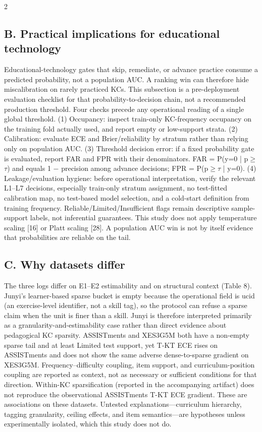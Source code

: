 \documentclass[10pt,a4paper]{article}
\begin{document}
\begin{multicols}{2}
\subsection*{B. Practical implications for educational technology}

Educational-technology gates that skip, remediate, or advance practice consume a predicted probability, not a population AUC. A ranking win can therefore hide miscalibration on rarely practiced KCs. This subsection is a pre-deployment evaluation checklist for that probability-to-decision chain, not a recommended production threshold. Four checks precede any operational reading of a single global threshold. (1) Occupancy: inspect train-only KC-frequency occupancy on the training fold actually used, and report empty or low-support strata. (2) Calibration: evaluate ECE and Brier/reliability by stratum rather than relying only on population AUC. (3) Threshold decision error: if a fixed probability gate is evaluated, report FAR and FPR with their denominators. FAR = P(y=0 | p$\geq$$\tau$) and equals 1 $-$ precision among advance decisions; FPR = P(p$\geq$$\tau$ | y=0). (4) Leakage/evaluation hygiene: before operational interpretation, verify the relevant L1--L7 decisions, especially train-only stratum assignment, no test-fitted calibration map, no test-based model selection, and a cold-start definition from training frequency. Reliable/Limited/Insufficient flags remain descriptive sample-support labels, not inferential guarantees. This study does not apply temperature scaling [16] or Platt scaling [28]. A population AUC win is not by itself evidence that probabilities are reliable on the tail.

\subsection*{C. Why datasets differ}

 The three logs differ on E1--E2 estimability and on structural context (Table 8). Junyi's learner-based sparse bucket is empty because the operational field is ucid (an exercise-level identifier, not a skill tag), so the protocol can refuse a sparse claim when the unit is finer than a skill. Junyi is therefore interpreted primarily as a granularity-and-estimability case rather than direct evidence about pedagogical KC sparsity. ASSISTments and XES3G5M both have a non-empty sparse tail and at least Limited test support, yet T-KT ECE rises on ASSISTments and does not show the same adverse dense-to-sparse gradient on XES3G5M. Frequency--difficulty coupling, item support, and curriculum-position coupling are reported as context, not as necessary or sufficient conditions for that direction. Within-KC sparsification (reported in the accompanying artifact) does not reproduce the observational ASSISTments T-KT ECE gradient. These are associations on these datasets. Untested explanations---curriculum hierarchy, tagging granularity, ceiling effects, and item semantics---are hypotheses unless experimentally isolated, which this study does not do.


\end{multicols}
\end{document}
